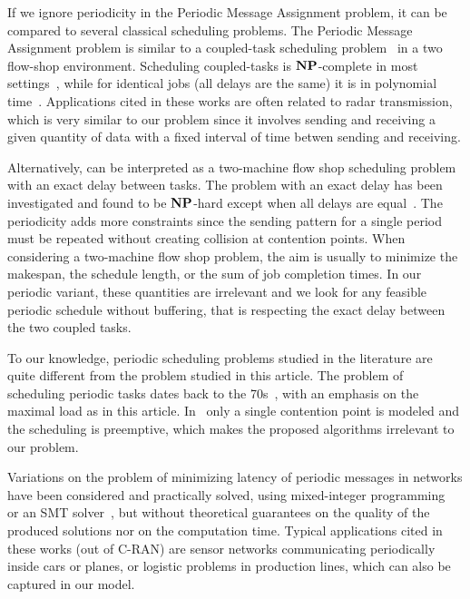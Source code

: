 \documentclass[pdflatex,sn-mathphys,iicol]{sn-jnl}%
\theoremstyle{thmstyleone}%
\theoremstyle{thmstyletwo}%
\theoremstyle{thmstylethree}%
\begin{document}
If we ignore periodicity in the Periodic Message Assignment problem, it can be compared to several classical scheduling problems. The Periodic Message Assignment problem is similar to a coupled-task scheduling problem~\cite{shapiro1980scheduling,khatami2020coupled,chen2021scheduling} in a two flow-shop environment. Scheduling coupled-tasks is $\textbf{NP}$-complete in most settings~\cite{orman1997complexity}, while for identical jobs (all delays are the same) it is in polynomial time~\cite{baptiste2010note}. Applications cited in these works are often related to radar transmission, which is very similar to our problem since it involves sending and receiving a given quantity of data with a fixed interval of time betwen sending and receiving. 

Alternatively, \pma can be interpreted as a two-machine flow shop scheduling problem~\cite{johnson1954optimal,yu2004minimizing} with an exact delay between tasks. The problem with an exact delay has been investigated and found to be $\textbf{NP}$-hard except when all delays are equal~\cite{leung2007scheduling}. The periodicity adds more constraints since the sending pattern for a single period must be repeated without creating collision at contention points. When considering a two-machine flow shop problem, the aim is usually to minimize the makespan, the schedule length, or the sum of job completion times. In our periodic variant, these quantities are irrelevant and we look for any feasible periodic schedule without buffering, that is respecting the exact delay between the two coupled tasks.

 To our knowledge, periodic scheduling problems studied in the literature are quite different from the problem studied in this article. The problem of scheduling periodic tasks dates back to the 70s~\cite{liu1973scheduling}, with an emphasis on the maximal load as in this article. In~\cite{liu1973scheduling} only a single contention point is modeled and the scheduling is preemptive, which makes the proposed algorithms irrelevant to our problem.

 Variations on the problem of minimizing latency of periodic messages in networks have been considered and practically solved, using mixed-integer programming~\cite{nayak2017incremental,steiner2018traffic} or an SMT solver~\cite{dos2019tsnsched}, but without theoretical guarantees on the quality of the produced solutions nor on the computation time. Typical applications cited in these works (out of C-RAN) are sensor networks communicating periodically inside cars or planes, or logistic problems in production lines, which can also be captured in our model.
\end{document}

